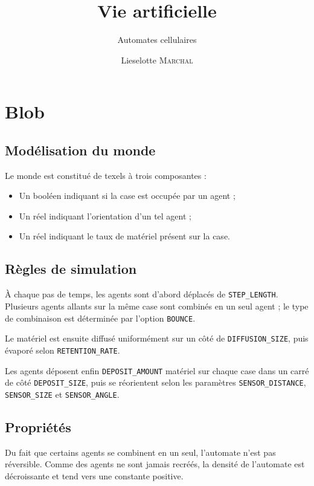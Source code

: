 \documentclass[11pt]{scrartcl}
\title{Vie artificielle}
\subtitle{Automates cellulaires}
\author{Lieselotte \textsc{Marchal}}
\begin{document}
    \maketitle
    
    \section{Blob}
        \subsection{Modélisation du monde}
            Le monde est constitué de texels à trois composantes :
            \begin{itemize}
                \item Un booléen indiquant si la case est occupée par un agent ;
                \item Un réel indiquant l'orientation d'un tel agent ;
                \item Un réel indiquant le taux de matériel présent sur la case.
            \end{itemize}
        
        \subsection{Règles de simulation}
            À chaque pas de temps, les agents sont d'abord déplacés de \texttt{STEP\_LENGTH}.
            Plusieurs agents allants sur la même case sont combinés en un seul agent ; le type de combinaison est déterminée par l'option \texttt{BOUNCE}.
            
            Le matériel est ensuite diffusé uniformément sur un côté de \texttt{DIFFUSION\_SIZE}, puis évaporé selon \texttt{RETENTION\_RATE}.
            
            Les agents déposent enfin \texttt{DEPOSIT\_AMOUNT} matériel sur chaque case dans un carré de côté \texttt{DEPOSIT\_SIZE}, puis se réorientent
            selon les paramètres \texttt{SENSOR\_DISTANCE}, \texttt{SENSOR\_SIZE} et \texttt{SENSOR\_ANGLE}.
        
        \subsection{Propriétés}
            Du fait que certains agents se combinent en un seul, l'automate n'est pas réversible.
            Comme des agents ne sont jamais recréés, la densité de l'automate est décroissante et tend vers une constante positive.
        
\end{document}
